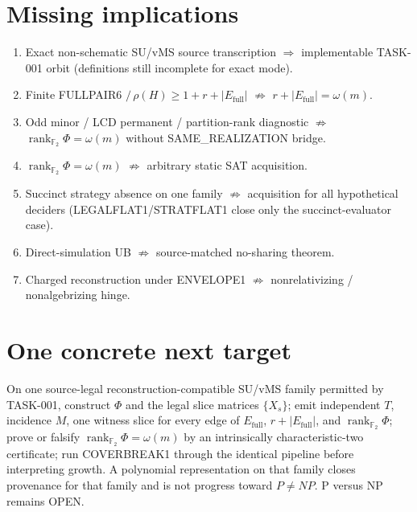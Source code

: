\documentclass[11pt]{article}
\begin{document}
\section*{Missing implications}
\begin{enumerate}
\item Exact non-schematic SU/vMS source transcription $\Rightarrow$ implementable
TASK-001 orbit (definitions still incomplete for exact mode).
\item Finite FULLPAIR6 $/\,\rho(H)\ge 1+r+|E_{\mathrm{full}}|$ $\not\Rightarrow$
$r+|E_{\mathrm{full}}|=\omega(m)$.
\item Odd minor / LCD permanent / partition-rank diagnostic $\not\Rightarrow$
$\operatorname{rank}_{\mathbb F_2}\Phi=\omega(m)$ without SAME\_REALIZATION bridge.
\item $\operatorname{rank}_{\mathbb F_2}\Phi=\omega(m)$ $\not\Rightarrow$ arbitrary
static SAT acquisition.
\item Succinct strategy absence on one family $\not\Rightarrow$ acquisition for all
hypothetical deciders (LEGALFLAT1/STRATFLAT1 close only the succinct-evaluator case).
\item Direct-simulation UB $\not\Rightarrow$ source-matched no-sharing theorem.
\item Charged reconstruction under ENVELOPE1 $\not\Rightarrow$ nonrelativizing /
nonalgebrizing hinge.
\end{enumerate}

\section*{One concrete next target}
On one source-legal reconstruction-compatible SU/vMS family permitted by TASK-001,
construct $\Phi$ and the legal slice matrices $\{X_s\}$; emit independent $T$,
incidence $M$, one witness slice for every edge of $E_{\mathrm{full}}$,
$r+|E_{\mathrm{full}}|$, and $\operatorname{rank}_{\mathbb F_2}\Phi$; prove or
falsify $\operatorname{rank}_{\mathbb F_2}\Phi=\omega(m)$ by an intrinsically
characteristic-two certificate; run COVERBREAK1 through the identical pipeline
before interpreting growth. A polynomial representation on that family closes
provenance for that family and is not progress toward $P\neq NP$.
P versus NP remains OPEN.
\end{document}
